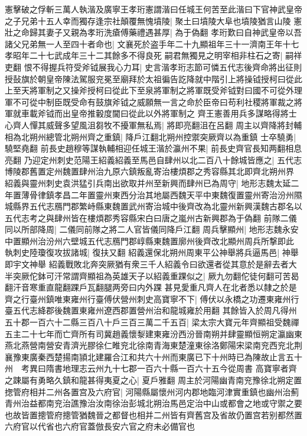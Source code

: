 憲擊破之俘斬三萬人執湝及廣寧王孝珩憲謂湝曰任城王何苦至此湝曰下官神武皇帝之子兄弟十五人幸而獨存逢宗社顛覆無愧墳陵|{
	聚土曰墳陵大阜也墳陵猶言山陵}
憲壯之命歸其妻子又親為孝珩洗瘡傅藥禮遇甚厚|{
	為于偽翻}
孝珩歎曰自神武皇帝以吾諸父兄弟無一人至四十者命也|{
	文襄死於盗手年二十九顯祖年三十一濟南王年十七孝昭年二十七武成年三十二其餘多不得良死}
嗣君無獨見之明宰相非柱石之寄|{
	嗣祥吏翻}
恨不得握兵符受斧钺展我心力耳|{
	史言湝孝珩志節可憐五代志後齊命將出征則授鼔旗於朝皇帝陳法駕服兖冕至廟拜於太祖徧告訖降就中階引上將操钺授柯曰從此上至天將軍制之又操斧授柯曰從此下至泉將軍制之將軍既受斧钺對曰國不可從外理軍不可從中制臣既受命有鼓旗斧钺之威願無一言之命於臣帝曰苟利社稷將軍裁之將軍就車載斧钺而出皇帝推轂度閫曰從此以外將軍制之}
齊王憲善用兵多謀略得將士心齊人憚其威聲多望風沮芻牧不擾軍無私焉|{
	將即亮翻沮在呂翻}
周主以齊降將封輔相為北朔州總管北朔州齊之重鎮|{
	降戶江翻北朔州控禦突厥齊以為重鎮}
士卒驍勇|{
	驍堅堯翻}
前長史趙穆等謀執輔相迎任城王湝於瀛州不果|{
	前長史齊官長知两翻相息亮翻}
乃迎定州刺史范陽王紹義紹義至馬邑自肆州以北二百八十餘城皆應之|{
	五代志博陵郡舊置定州魏置肆州治九原六鎮叛亂寄治樓煩郡之秀容縣其北即齊北朔州界}
紹義與靈州刺史袁洪猛引兵南出欲取并州至新興而肆州已為周守|{
	地形志魏太延二年置薄骨律鎮孝昌二年置靈州東西分治其地屬西魏天平中東魏復置靈州寄治汾州隰城縣界五代志鴈門郡繁峙縣東魏置武州寄治城中後齊改為北靈州新興漢魏古郡名以五代志考之與肆州皆在樓煩郡秀容縣宋白曰唐之嵐州古新興郡為于偽翻}
前隊二儀同以所部降周|{
	二儀同前隊之將二人官皆儀同降戶江翻}
周兵擊顯州|{
	地形志魏永安中置顯州治汾州六壁城五代志鴈門郡崞縣東魏置廓州後齊改北顯州周兵所撃即此}
執刺史陸瓊復攻拔諸城|{
	復扶又翻}
紹義還保北朔州周東平公神舉將兵逼馬邑|{
	神舉即宇文神舉}
紹義戰敗北奔突厥猶有衆三千人紹義令曰欲還者從其意於是辭去者大半突厥佗鉢可汗常謂齊顯祖為英雄天子以紹義重踝似之|{
	厥九勿翻佗徒何翻可苦曷翻汗音寒重直龍翻踝戶瓦翻腿两旁曰内外踝}
甚見愛重凡齊人在北者悉以隸之於是齊之行臺州鎮唯東雍州行臺傅伏營州刺史高寶寧不下|{
	傅伏以永橋之功遷東雍州行臺五代志絳郡後魏置東雍州遼西郡置營州治和龍城雍於用翻}
其餘皆入於周凡得州五十郡一百六十二縣三百八十戶三百三萬二千五百|{
	梁太宗大寶元年齊顯祖受魏禪五主二十七年而亡齊所有司冀趙義懷㴝建東雍汾西汾晉南朔并肆靈顯恒朔定瀛幽東燕北燕營南營安青濟光膠徐仁睢兖北徐南青海東楚潼東徐洛鄭陽宋梁南兖西兖北荆襄豫東廣秦西楚揚南頴北建羅合江和共六十州而東廣已下十州時已為陳故止言五十州　考異曰隋書地理志云州九十七郡一百六十縣一百六十五今從周書}
高寶寧者齊之踈屬有勇略久鎮和龍甚得夷夏之心|{
	夏戶雅翻}
周主於河陽幽青南兖豫徐北朔定置揔管府相并二州各置宫及六府官|{
	河陽縣屬懷州河内郡地臨河津實重鎮也幽州治薊青州治益都南兖治譙豫治汝南徐治彭城北朔治馬邑定治中山或都會之地或守禦之要也故皆置摠管府摠管猶魏晉之都督也相并二州皆有齊舊宫及省故仍置宫若别都然置六府官以代省也六府官蓋倣長安六官之府未必備官也}

